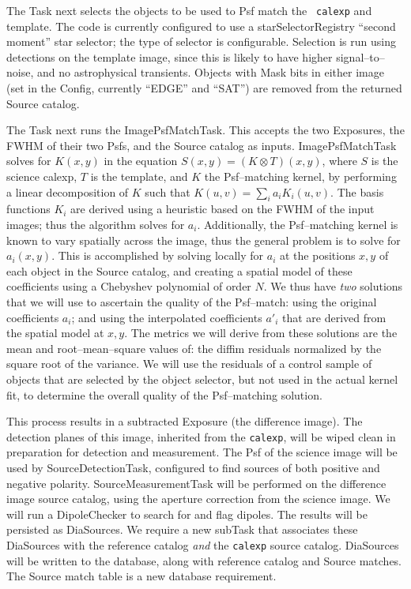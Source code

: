 \documentclass[prd, nofootinbib, floatfix, 11pt,tightenlines,times]{article}
\begin{document}
The Task next selects the objects to be used to Psf match the {\tt
  calexp} and template.  The code is currently configured to use a
starSelectorRegistry ``second moment'' star selector; the type of
selector is configurable.  Selection is run using detections on the
template image, since this is likely to have higher signal--to--noise,
and no astrophysical transients.  Objects with Mask bits in either
image (set in the Config, currently ``EDGE'' and ``SAT'') are removed
from the returned Source catalog.

The Task next runs the ImagePsfMatchTask.  This accepts the two
Exposures, the FWHM of their two Psfs, and the Source catalog as
inputs.  ImagePsfMatchTask solves for $K(x,y)$ in the equation $S(x,y)
= (K \otimes T)(x,y)$, where $S$ is the science calexp, $T$ is the
template, and $K$ the Psf--matching kernel, by performing a linear
decomposition of $K$ such that $K(u,v) = \sum_i a_i K_i(u,v)$.  The
basis functions $K_i$ are derived using a heuristic based on the FWHM
of the input images; thus the algorithm solves for $a_i$.
Additionally, the Psf--matching kernel is known to vary spatially
across the image, thus the general problem is to solve for $a_i(x,y)$.
This is accomplished by solving locally for $a_i$ at the positions
$x,y$ of each object in the Source catalog, and creating a spatial
model of these coefficients using a Chebyshev polynomial of order $N$.
We thus have {\it two} solutions that we will use to ascertain the
quality of the Psf--match: using the original coefficients $a_i$; and
using the interpolated coefficients $a{'}_i$ that are derived from the
spatial model at $x,y$.  The metrics we will derive from these
solutions are the mean and root--mean--square values of: the diffim
residuals normalized by the square root of the variance.  We will use
the residuals of a control sample of objects that are selected by the
object selector, but not used in the actual kernel fit, to determine
the overall quality of the Psf--matching solution.

This process results in a subtracted Exposure (the difference image).
The detection planes of this image, inherited from the {\tt calexp},
will be wiped clean in preparation for detection and measurement.  The
Psf of the science image will be used by SourceDetectionTask,
configured to find sources of both positive and negative polarity.
SourceMeasurementTask will be performed on the difference image source
catalog, using the aperture correction from the science image.  We
will run a DipoleChecker to search for and flag
dipoles.  The results will be persisted as DiaSources.  We require a
new subTask that associates these DiaSources with the reference
catalog {\it and} the {\tt calexp} source catalog.  DiaSources will be written to the database,
along with reference catalog and Source matches.  The Source match
table is a new database requirement.
\end{document}
